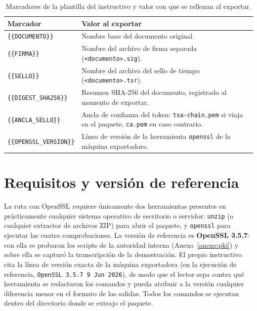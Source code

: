 \begin{table}[H]
  \centering
  \caption{Marcadores de la plantilla del instructivo y valor con que se rellenan al exportar.}
  \label{tab:verificacion-marcadores}
  \begin{tabularx}{\linewidth}{@{}l X@{}}
    \toprule
    \textbf{Marcador} & \textbf{Valor al exportar} \\
    \midrule
    \texttt{\{\{DOCUMENTO\}\}} & Nombre base del documento original. \\
    \texttt{\{\{FIRMA\}\}} & Nombre del archivo de firma separada (\texttt{<documento>.sig}). \\
    \texttt{\{\{SELLO\}\}} & Nombre del archivo del sello de tiempo (\texttt{<documento>.tsr}). \\
    \texttt{\{\{DIGEST\_SHA256\}\}} & Resumen SHA-256 del documento, registrado al momento de exportar. \\
    \texttt{\{\{ANCLA\_SELLO\}\}} & Ancla de confianza del token: \texttt{tsa-chain.pem} si viaja en el paquete, \texttt{ca.pem} en caso contrario. \\
    \texttt{\{\{OPENSSL\_VERSION\}\}} & Línea de versión de la herramienta \texttt{openssl} de la máquina exportadora. \\
    \bottomrule
  \end{tabularx}
\end{table}

\section{Requisitos y versión de referencia}\label{sec:verificacion-requisitos}

La ruta con OpenSSL requiere únicamente dos herramientas presentes en prácticamente cualquier sistema operativo de escritorio o servidor: \texttt{unzip} (o cualquier extractor de archivos ZIP) para abrir el paquete, y \texttt{openssl} \cite{openssl_docs} para ejecutar las cuatro comprobaciones. La versión de referencia es \textbf{OpenSSL 3.5.7}: con ella se probaron los scripts de la autoridad interna (Anexo~\ref{anexo:pki}) y sobre ella se capturó la transcripción de la demostración. El propio instructivo cita la línea de versión exacta de la máquina exportadora (en la ejecución de referencia, \texttt{OpenSSL 3.5.7 9 Jun 2026}), de modo que el lector sepa contra qué herramienta se redactaron los comandos y pueda atribuir a la versión cualquier diferencia menor en el formato de las salidas. Todos los comandos se ejecutan dentro del directorio donde se extrajo el paquete.

